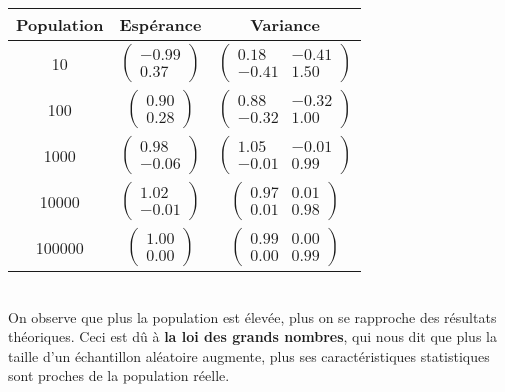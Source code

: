 \documentclass[a4paper,11pt]{article}
\begin{document}
\begin{center}
\begin{tabular}{|c|c|c|}
\hline
Population & Espérance & Variance \\
\hline
10 & $\left (\begin{array}{ccc} -0.99 \\0.37\end{array}\right)$ & $\begin{pmatrix}0.18&-0.41\\-0.41&1.50\end{pmatrix}$\\ 
100 & $\left (\begin{array}{ccc} 0.90 \\0.28\end{array}\right)$ &$\begin{pmatrix}0.88&-0.32\\-0.32&1.00\end{pmatrix}$\\ 
1000 & $\left (\begin{array}{ccc} 0.98 \\-0.06\end{array}\right)$ & $ \begin{pmatrix}1.05&-0.01\\-0.01&0.99\end{pmatrix}$\\ 
10000 & $\left (\begin{array}{ccc} 1.02 \\-0.01\end{array}\right)$ & $\begin{pmatrix}0.97&0.01\\0.01&0.98\end{pmatrix}$\\
100000 & $\left (\begin{array}{ccc} 1.00 \\0.00\end{array}\right)$ & $\begin{pmatrix}0.99&0.00\\0.00&0.99\end{pmatrix}$\\ 
\hline
\end{tabular}
\end{center}
\\

\noindent On observe que plus la population est élevée, plus on se rapproche des résultats théoriques. Ceci est dû à \textbf{la loi des grands nombres}, qui nous dit que plus la taille d'un échantillon aléatoire augmente, plus ses caractéristiques statistiques sont proches de la population réelle.
\end{document}
